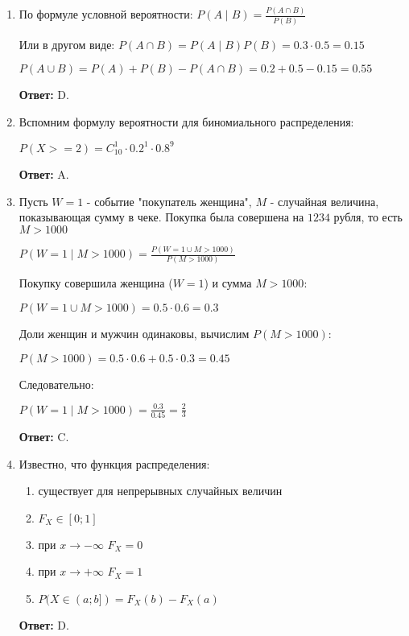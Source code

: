 \documentclass[a4paper]{article} %
\begin{document}
\begin{enumerate}
    \item
    По формуле условной вероятности:
    $P(A\mid B) = \frac{P(A\cap B)}{P(B)}$
    
    Или в другом виде:
    $P(A\cap B)=P(A\mid B)P(B) = 0.3 \cdot 0.5 = 0.15$
    
    $P(A\cup B) = P(A) + P(B) - P(A\cap B) = 0.2+0.5-0.15 = 0.55$
    
    \textbf{Ответ:} D.
    
    
    \item
    Вспомним формулу вероятности для биномиального распределения:
    
    $P(X>=2) = C_{10}^1 \cdot0.2^1 \cdot 0.8^9$
    
    \textbf{Ответ:} A.
    
    \item
    Пусть $W=1$ - событие "покупатель женщина", $M$ - случайная величина, показывающая сумму в чеке. Покупка была совершена на $1234$ рубля, то есть $M>1000$
    
    $P(W=1 \mid M>1000) = \frac{P(W=1 \cup M>1000)}{P(M>1000)}$
    
    Покупку совершила женщина ($W=1$) и сумма $M>1000$:
    
    $P(W=1 \cup M>1000) = 0.5 \cdot 0.6 = 0.3$

    Доли женщин и мужчин одинаковы, вычислим $P(M>1000)$:
    
    $P(M>1000) = 0.5 \cdot 0.6 + 0.5 \cdot 0.3 = 0.45$
    
    
    Следовательно:
    
    $P(W=1 \mid M>1000) = \frac{0.3}{0.45} = \frac{2}{3}$
    
    \textbf{Ответ:} C.
    
    
    \item
    Известно, что функция распределения:
    \begin{enumerate}
        \item существует для непрерывных случайных величин
        \item $F_X \in [0; 1]$
        \item при $x\rightarrow{-\infty}$ $F_X = 0$
        \item при $x\rightarrow{+\infty}$ $F_X = 1$
        \item $P(X \in (a; b]) = F_X(b) - F_X(a)$
    \end{enumerate} 
    
    \textbf{Ответ:} D.
    
    
\end{enumerate}
\end{document}
